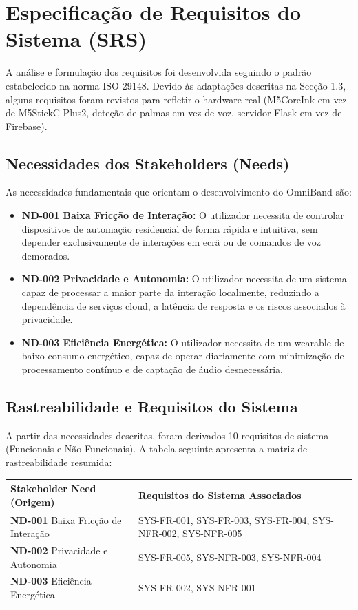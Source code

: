\documentclass[11pt, a4paper]{article}
\begin{document}
\section{Especificação de Requisitos do Sistema (SRS)}

A análise e formulação dos requisitos foi desenvolvida seguindo o padrão estabelecido na norma ISO 29148. Devido às adaptações descritas na Secção 1.3, alguns requisitos foram revistos para refletir o hardware real (M5CoreInk em vez de M5StickC Plus2, deteção de palmas em vez de voz, servidor Flask em vez de Firebase).

\subsection{Necessidades dos Stakeholders (Needs)}
As necessidades fundamentais que orientam o desenvolvimento do OmniBand são:
\begin{itemize}
    \item \textbf{ND-001 Baixa Fricção de Interação:} O utilizador necessita de controlar dispositivos de automação residencial de forma rápida e intuitiva, sem depender exclusivamente de interações em ecrã ou de comandos de voz demorados.
    \item \textbf{ND-002 Privacidade e Autonomia:} O utilizador necessita de um sistema capaz de processar a maior parte da interação localmente, reduzindo a dependência de serviços cloud, a latência de resposta e os riscos associados à privacidade.
    \item \textbf{ND-003 Eficiência Energética:} O utilizador necessita de um wearable de baixo consumo energético, capaz de operar diariamente com minimização de processamento contínuo e de captação de áudio desnecessária.
\end{itemize}

\subsection{Rastreabilidade e Requisitos do Sistema}
A partir das necessidades descritas, foram derivados 10 requisitos de sistema (Funcionais e Não-Funcionais). A tabela seguinte apresenta a matriz de rastreabilidade resumida:

\begin{table}[H]
    \small
    \centering
    \begin{tabular}{|p{}|p{}|}
        \hline
        \cellcolor{lightgray}\textbf{Stakeholder Need (Origem)} &
        \cellcolor{lightgray}\textbf{Requisitos do Sistema Associados} \\
        \hline
        \textbf{ND-001} Baixa Fricção de Interação & SYS-FR-001, SYS-FR-003, SYS-FR-004, SYS-NFR-002, SYS-NFR-005 \\
        \hline
        \textbf{ND-002} Privacidade e Autonomia & SYS-FR-005, SYS-NFR-003, SYS-NFR-004 \\
        \hline
        \textbf{ND-003} Eficiência Energética & SYS-FR-002, SYS-NFR-001 \\
        \hline
    \end{tabular}
\end{table}
\end{document}
